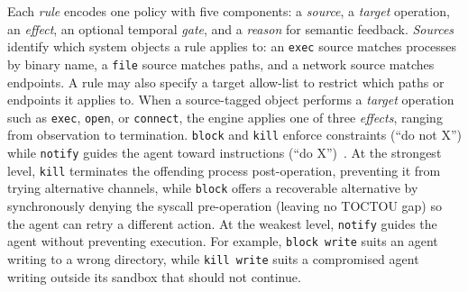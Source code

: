 Each \emph{rule} encodes one policy with five components: a \emph{source}, a \emph{target} operation, an \emph{effect}, an optional temporal \emph{gate}, and a \emph{reason} for semantic feedback.
\emph{Sources} identify which system objects a rule applies to: an \texttt{exec} source matches processes by binary name, a \texttt{file} source matches paths, and a network source matches endpoints.
A rule may also specify a target allow-list to restrict which paths or endpoints it applies to.
When a source-tagged object performs a \emph{target} operation such as \texttt{exec}, \texttt{open}, or \texttt{connect}, the engine applies one of three \emph{effects}, ranging from observation to termination.
\texttt{block} and \texttt{kill} enforce constraints (``do not X'') while \texttt{notify} guides the agent toward instructions (``do X'')~\cite{zhang2026guardrails}.
At the strongest level, \texttt{kill} terminates the offending process post-operation, preventing it from trying alternative channels, while \texttt{block} offers a recoverable alternative by synchronously denying the syscall pre-operation (leaving no TOCTOU gap) so the agent can retry a different action.
At the weakest level, \texttt{notify} guides the agent without preventing execution.
For example, \texttt{block write} suits an agent writing to a wrong directory, while \texttt{kill write} suits a compromised agent writing outside its sandbox that should not continue.

